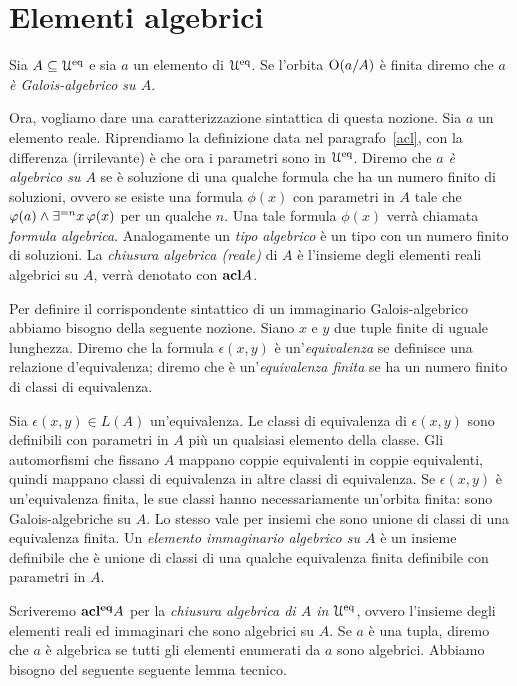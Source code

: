 \section{Elementi algebrici}\label{chiusura algebrica}

Sia $A\subseteq\EuScript U^{\rm eq}$ e sia $a$ un elemento di $\EuScript U^{\rm eq}$. Se l'orbita $\textrm{O}(a/A)$ \`e finita diremo che \emph{$a$ \`e Galois-algebrico su $A$}.

Ora, vogliamo dare una caratterizzazione sintattica di questa nozione. Sia $a$ un elemento reale. Riprendiamo la definizione data nel paragrafo~\ref{acl}, con la differenza (irrilevante) \`e che ora i parametri sono in $\EuScript U^{\rm eq}$. Diremo che \emph{$a$ \`e algebrico su $A$\/} se \`e soluzione di una qualche formula che ha un numero finito di soluzioni, ovvero se  esiste una formula $\phi(x)$ con parametri in $A$ tale che $\varphi(a)\wedge\exists^{=n}x\,\varphi(x)$ per un qualche $n$. Una tale formula $\phi(x)$  verr\`a chiamata \emph{formula algebrica}. Analogamente un \emph{tipo algebrico\/} \`e un tipo con un numero finito di soluzioni. La \emph{chiusura algebrica (reale)\/} di $A$ \`e l'insieme degli elementi reali algebrici su $A$, verr\`a denotato con \emph{${\rm\bf acl} A$}.

Per definire il corrispondente sintattico di un immaginario Galois-algebrico abbiamo bisogno della seguente nozione. Siano $x$ e $y$ due tuple finite di uguale lunghezza. Diremo che la formula $\epsilon(x,y)$ \`e un'\emph{equivalenza\/} se definisce una relazione d'equivalenza; diremo che \`e un'\emph{equivalenza finita\/} se  ha un numero finito di classi di equivalenza.

Sia $\epsilon(x,y)\in L(A)$ un'equivalenza. Le classi di equivalenza di $\epsilon(x,y)$ sono definibili con parametri in $A$ pi\`u un qualsiasi elemento della classe. Gli automorfismi che fissano $A$ mappano coppie equivalenti in coppie equivalenti, quindi mappano classi di equivalenza in altre classi di equivalenza. Se $\epsilon(x,y)$ \`e un'equivalenza finita, le sue classi hanno necessariamente un'orbita finita: sono Galois-algebriche su $A$. Lo stesso vale per insiemi che sono unione di classi di una equivalenza finita. Un \emph{elemento immaginario algebrico su $A$\/} \`e un insieme definibile che \`e unione di classi di una qualche equivalenza finita definibile con parametri in $A$. 

Scriveremo \emph{${\rm\bf acl^{eq}} A$} per la \emph{chiusura algebrica di $A$ in $\EuScript U^{\rm eq}$}, ovvero l'insieme degli elementi reali ed immaginari che sono algebrici su $A$. Se $a$ \`e una tupla, diremo che $a$ \`e algebrica se tutti gli elementi enumerati da $a$ sono algebrici.
Abbiamo bisogno del seguente seguente lemma tecnico.


